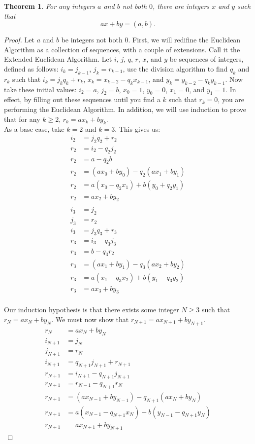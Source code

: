 \documentclass[12pt,leqno]{article}
\numberwithin{equation}{section}
\newtheorem{thm}{Theorem}[section]
\theoremstyle{definition}
\begin{document}
\begin{thm}
For any integers $a$ and $b$ not both $0$, there are integers $x$
and $y$ such that \[ax + by = (a, b).\]
\end{thm}

\begin{proof}[Proof]
Let $a$ and $b$ be integers not both $0$.  First, we will redifine the Euclidean Algorithm as a collection of sequences, with a couple of extensions.  Call it the Extended Euclidean Algorithm.  Let $i$, $j$, $q$, $r$, $x$, and $y$ be sequences of integers, defined as follows: $i_k = j_{k-1}$, $j_k = r_{k-1}$, use the division algorithm to find $q_k$ and $r_k$ such that $i_k = j_kq_k + r_k$, $x_k = x_{k-2} - q_kx_{k-1}$, and $y_k = y_{k-2} - q_ky_{k-1}$.  Now take these initial values: $i_2 = a$, $j_2 = b$, $x_0 = 1$, $y_0 = 0$, $x_1 = 0$, and $y_1 = 1$.  In effect, by filling out these sequences until you find a $k$ such that $r_k = 0$, you are performing the Euclidean Algorithm.  In addition, we will use induction to prove that for any $k \geq 2$, $r_k = ax_k + by_k$.\\

As a base case, take $k = 2$ and $k = 3$.  This gives us:
\begin{align*}
i_2 &= j_2q_2 + r_2\\
r_2 &= i_2 - q_2j_2\\
r_2 &= a - q_2b\\
r_2 &= (ax_0 + by_0) - q_2(ax_1 + by_1)\\
r_2 &= a(x_0 - q_2x_1) + b(y_0 + q_2y_1)\\
r_2 &= ax_2 + by_2\\
\\
i_3 &= j_2\\
j_3 &= r_2\\
i_3 &= j_3q_3 + r_3\\
r_3 &= i_3 - q_3j_3\\
r_3 &= b - q_3r_2\\
r_3 &= (ax_1 + by_1) - q_3(ax_2 + by_2)\\
r_3 &= a(x_1 - q_3x_2) + b(y_1 - q_3y_2)\\
r_3 &= ax_3 + by_3\\
\end{align*}

Our induction hypothesis is that there exists some integer $N \geq 3$ such that $r_N = ax_N + by_N$.  We must now show that $r_{N+1} = ax_{N+1} + by_{N+1}$.
\begin{align*}
r_N &= ax_N + by_N\\
i_{N+1} &= j_N\\
j_{N+1} &= r_N\\
i_{N+1} &= q_{N+1}j_{N+1} + r_{N+1}\\
r_{N+1} &= i_{N+1} - q_{N+1}j_{N+1}\\
r_{N+1} &= r_{N-1} - q_{N+1}r_N\\
r_{N+1} &= (ax_{N-1} + by_{N-1}) - q_{N+1}(ax_N + by_N)\\
r_{N+1} &= a(x_{N-1} - q_{N+1}x_N) + b(y_{N-1} - q_{N+1}y_N)\\
r_{N+1} &= ax_{N+1} + by_{N+1}
\end{align*}


\end{proof}
\end{document}

